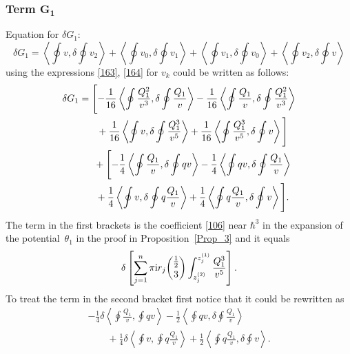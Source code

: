 \documentclass[pdftex]{sigma}
\numberwithin{equation}{section}
\theoremstyle{definition}
\begin{document}
\subsubsection[Term G\_1]{Term $\boldsymbol{G_1}$}
Equation for $\delta G_{1}$:
\begin{equation*}%
\delta G_{1}=\left\langle \oint v,\delta \oint v_2\right\rangle +\left\langle \oint v_0,\delta \oint v_1\right\rangle +\left\langle \oint v_1,\delta \oint v_0\right\rangle +\left\langle \oint v_2,\delta \oint v\right\rangle
\end{equation*}
using the expressions \eqref{163}, \eqref{164} for $v_k$ could be written as follows:
\begin{gather*}%
\delta G_{1}=\Bigg[{-}\frac{1}{16}\left\langle \oint \frac{Q^2_1}{v^3}, \delta \oint \frac{Q_1}{v}\right\rangle -\frac{1}{16}\left\langle \oint \frac{Q_1}{v}, \delta \oint \frac{Q^2_1}{v^3}\right\rangle \\
\hphantom{\delta G_{1}=}{}
+\frac{1}{16}\left\langle \oint v,\delta \oint \frac{Q^3_1}{v^5}\right\rangle +\frac{1}{16}\left\langle \oint \frac{Q^3_1}{v^5},\delta \oint v\right\rangle \Bigg]\\
\hphantom{\delta G_{1}=}{}
+\Bigg[{-}\frac{1}{4}\left\langle \oint \frac{Q_1}{v},\delta \oint {qv}\right\rangle -\frac{1}{4}\left\langle \oint {qv},\delta \oint \frac{Q_1}{v}\right\rangle \\
\hphantom{\delta G_{1}=}{}
+\frac{1}{4}\left\langle \oint v,\delta \oint q\frac{Q_1}{v}\right\rangle +\frac{1}{4}\left\langle \oint q\frac{Q_1}{v},\delta \oint v\right\rangle \Bigg].
\end{gather*}
The term in the first brackets is the coefficient \eqref{106} near $\hbar^3$ in the expansion of the potential~$\theta_1$ in the proof in Proposition~\ref{Prop_3} and it equals
\begin{equation*}
\delta\left[\sum^n_{j=1}\pi{\rm i} r_j\binom{\frac{1}{2}}{3}
 \int^{z^{(1)}_j}_{z^{(2)}_j}\frac{Q^3_1}{v^{5}} \right].
\end{equation*}
To treat the term in the second bracket first notice that it could be rewritten as
\begin{gather}
-\frac{1}{4}\delta\left\langle \oint \frac{Q_1}{v},\oint {qv}\right\rangle -\frac{1}{2}\left\langle \oint {qv},\delta \oint \frac{Q_1}{v}\right\rangle \nonumber\\
\qquad{} +\frac{1}{4}\delta\left\langle \oint v, \oint q\frac{Q_1}{v}\right\rangle +\frac{1}{2}\left\langle \oint q\frac{Q_1}{v},\delta \oint v\right\rangle .\label{simp}\end{gather}
\end{document}
